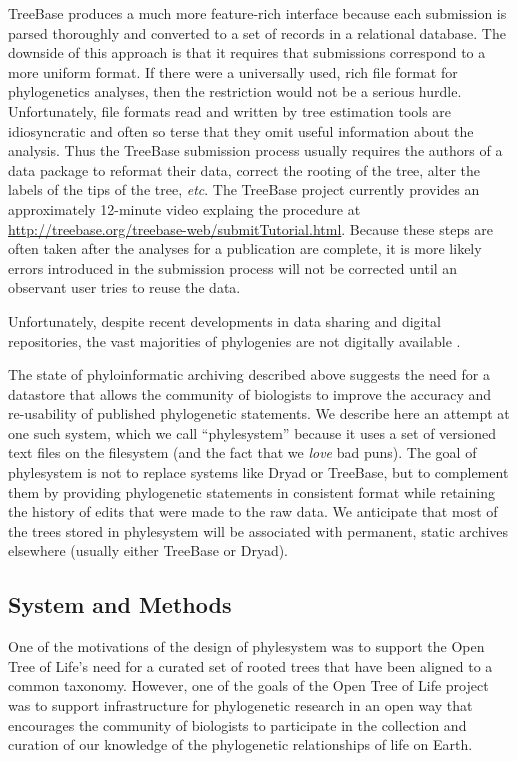 \documentclass[a4paper,10pt]{article}
\newcommand{\ps}{phylesystem\xspace}
\newcommand{\otol}{Open Tree of Life\xspace}
\begin{document}
TreeBase produces a much more feature-rich interface because each submission is parsed thoroughly and converted 
    to a set of records in a relational database.
The downside of this approach is that it requires that submissions correspond to a more uniform format.
If there were a universally used, rich file format for phylogenetics analyses, then the restriction would not be a
    serious hurdle.
Unfortunately, file formats read and written by tree estimation tools are idiosyncratic and often so 
    terse that they omit useful information about the analysis.
Thus the TreeBase submission process usually requires the authors of a data package to reformat their data, correct
    the rooting of the tree, alter the labels of the tips of the tree, {\em etc}.
The TreeBase project currently provides an approximately 12-minute video explaing the procedure at 
    \url{http://treebase.org/treebase-web/submitTutorial.html}.
Because these steps are often taken after the analyses for a publication are complete, it is more likely 
    errors introduced in the submission process will not be corrected until an observant user tries to reuse the data.

Unfortunately, despite recent developments in data sharing and digital repositories,
    the vast majorities of phylogenies are not digitally available \cite{Drew}.

The state of phyloinformatic archiving described above suggests the need for a datastore that allows the 
    community of biologists to improve the accuracy and re-usability of published phylogenetic statements.
We describe here an attempt at one such system, which we call ``phylesystem'' because it uses a set of
    versioned text files on the filesystem (and the fact that we {\em love} bad puns).
The goal of \ps is not to replace systems like Dryad or TreeBase, but to complement them by 
    providing phylogenetic statements in consistent format while retaining the history of
    edits that were made to the raw data.
We anticipate that most of the trees stored in \ps will be associated with permanent, static archives
    elsewhere (usually either TreeBase or Dryad).

\subsection{System and Methods}
One of the motivations of the design of \ps was to support the \otol's need for a curated set
    of rooted trees that have been aligned to a common taxonomy.
However, one of the goals of the \otol project was to support infrastructure for phylogenetic
    research in an open way that encourages the community of biologists to participate in the 
    collection and curation of our knowledge of the phylogenetic relationships of life on Earth.
\end{document}
